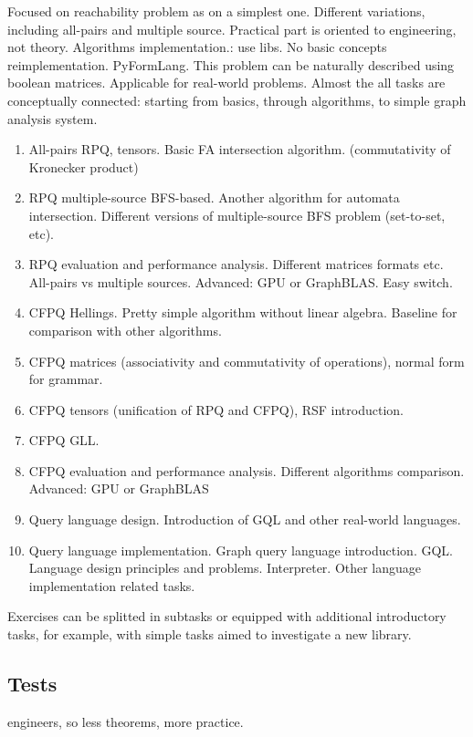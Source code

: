 \documentclass[sigconf]{acmart}
\begin{document}
Focused on reachability problem as on a simplest one. 
Different variations, including all-pairs and multiple source.
Practical part is oriented to engineering, not theory. 
Algorithms implementation.: use libs. 
No basic concepts reimplementation. PyFormLang.
This problem can be naturally described using boolean matrices. 
Applicable for real-world problems. 
Almost the all tasks are conceptually connected: starting from basics, through algorithms, to simple graph analysis system.

\begin{enumerate}
  \item All-pairs RPQ, tensors. Basic FA intersection algorithm. (commutativity of Kronecker product)
  \item RPQ multiple-source BFS-based. Another algorithm for automata intersection. Different versions of multiple-source BFS problem (set-to-set, etc).  
  \item RPQ evaluation and performance analysis. Different matrices formats etc. All-pairs vs multiple sources. Advanced: GPU or GraphBLAS. Easy switch.
  \item CFPQ Hellings. Pretty simple algorithm without linear algebra. Baseline for comparison with other algorithms. 
  \item CFPQ matrices (associativity and commutativity of operations), normal form for grammar.
  \item CFPQ tensors (unification of RPQ and CFPQ), RSF introduction.
  \item CFPQ GLL. 
  \item CFPQ evaluation and performance analysis. Different algorithms comparison. Advanced: GPU or GraphBLAS 
  \item Query language design. Introduction of GQL and other real-world languages. 
  \item Query language implementation. Graph query language introduction. GQL. Language design principles and problems. Interpreter. Other language implementation related tasks.
\end{enumerate}

Exercises can be splitted in subtasks or equipped with additional introductory tasks, for example, with simple tasks aimed to investigate a new library.

\subsection{Tests}

engineers, so less theorems, more practice.
\end{document}
